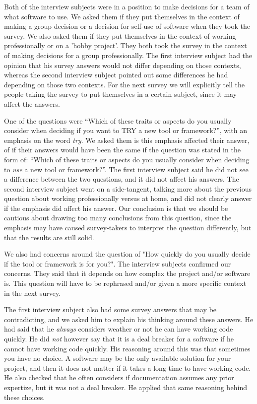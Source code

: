 \documentclass{article}
\begin{document}
Both of the interview subjects were in a position to make decisions for
a team of what software to use. We asked them if they put themselves in
the context of making a group decision or a decision for self-use of
software when they took the survey. We also asked them if they put
themselves in the context of working professionally or on a 'hobby
project'. They both took the survey in the context of making decisions
for a group professionally. The first interview subject had the opinion
that his survey answers would not differ depending on those contexts,
whereas the second interview subject pointed out some differences he had
depending on those two contexts. For the next survey we will explicitly
tell the people taking the survey to put themselves in a certain
subject, since it may affect the answers.

One of the questions were “Which of these traits or aspects do you
usually consider when deciding if you want to TRY a new tool or
framework?”, with an emphasis on the word \textit{try}. We asked them is this
emphasis affected their answer, of if their answers would have been the
same if the question was stated in the form of: “Which of these traits
or aspects do you usually consider when deciding to \textit{use} a new tool or
framework?”. The first interview subject said he did not see a
difference between the two questions, and it did not affect his answers.
The second interview subject went on a side-tangent, talking more about
the previous question about working professionally versus at home, and
did not clearly answer if the emphasis did affect his answer. Our
conclusion is that we should be cautious about drawing too many
conclusions from this question, since the emphasis may have caused
survey-takers to interpret the question differently, but that the
results are still solid.

We also had concerns around the question of "How quickly do you usually
decide if the tool or framework is for you?". The interview subjects
confirmed our concerns. They said that it depends on how complex the
project and/or software is. This question will have to be rephrased
and/or given a more specific context in the next survey.

The first interview subject also had some survey answers that may be
contradicting, and we asked him to explain his thinking around these
answers. He had said that he \textit{always} considers weather or not he can
have working code quickly. He did \textit{not} however say that it is a deal
breaker for a software if he cannot have working code quickly. His
reasoning around this was that sometimes you have no choice. A software
may be the only available solution for your project, and then it does
not matter if it takes a long time to have working code. He also checked
that he often considers if documentation assumes any prior expertize,
but it was not a deal breaker. He applied that same reasoning behind
these choices.
\end{document}
